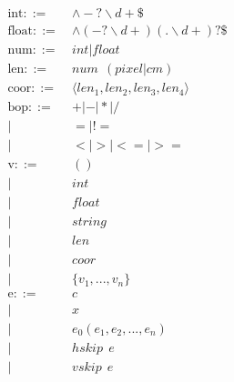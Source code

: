 \begin{figure*}[h]
\tiny
\RawFloats
\begin{minipage}{0.45\textwidth}

\begin{align*}
\text{int} ::=~& \land-?\backslash d+\$\\
\text{float} ::=~& \land(-?\backslash d+)(.\backslash d+)?\$\\
\text{num} ::=~& int|float\\
\text{len} ::=~& num ~~ (pixel|cm)\\
\text{coor} ::=~& \langle len_1, len_2, len_3, len_4\rangle\\
\text{bop} ::= 
~& +|-|*|/\\
|~&=|!=\\
|~&<|>|<=|>=\\
\text{v} ::=~& 
() \\
|~& int \\
|~& float \\
|~& string \\
|~& len \\
|~& coor \\
|~& \{v_1, ..., v_n\} \\
\text{e} ::= 
~& c \tag{constant}\label{syntax:constant}\\
|~& x \tag{name}\label{syntax:name}\\
|~& e_0(e_1, e_2, ..., e_n) \tag{constraints} \label{syntax:constraints}\\
|~& hskip ~~e \tag{horizontal skip}\label{syntax:hskip}\\
|~& vskip ~~e \tag{vertical skip}\label{syntax:vskip}\\

\end{align*}
\end{minipage}
\end{figure*}
